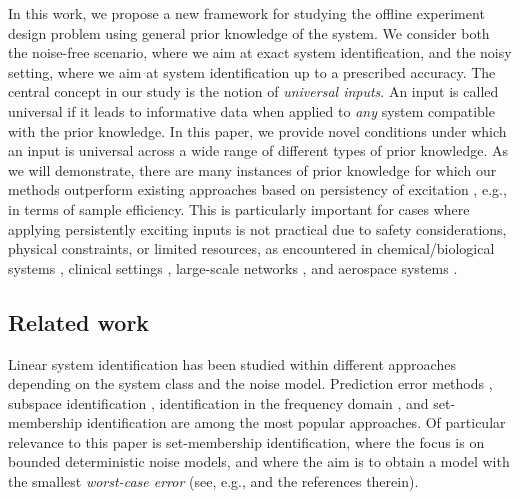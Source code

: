 \documentclass[journal,twoside,web]{ieeecolor}
\begin{document}
In this work, we propose a new framework for studying the offline experiment design problem using general prior knowledge of the system. We consider both the noise-free scenario, where we aim at exact system identification, and the noisy setting, where we aim at system identification up to a prescribed accuracy. The central concept in our study is the notion of \emph{universal inputs}. An input is called universal if it leads to informative data when applied to \emph{any} system compatible with the prior knowledge. In this paper, we provide novel conditions under which an input is universal across a wide range of different types of prior knowledge. As we will demonstrate, there are many instances of prior knowledge for which our methods outperform existing approaches based on persistency of excitation \cite{bai1985persistency,green1986persistence,willems2005note,coulson2022quantitative,berberich2023quantitative}, e.g., in terms of sample efficiency. This is particularly important for cases where applying persistently exciting inputs is not practical due to safety considerations, physical constraints, or limited resources, as encountered in chemical/biological systems \cite{sontag2003differential}, clinical settings \cite{engelhart2016comparison}, large-scale networks \cite{tsiamis2023statistical}, and aerospace systems \cite{prussing1970optimal}.

\subsection{Related work}

Linear system identification has been studied within different approaches depending on the system class and the noise model. Prediction error methods \cite{ljung1998system}, subspace identification \cite{van2012subspace}, identification in the frequency domain \cite{pintelon2012system}, and set-membership identification \cite{milanese2013bounding} are among the most popular approaches. Of particular relevance to this paper is set-membership identification, where the focus is on bounded deterministic noise models, and where the aim is to obtain a model with the smallest \emph{worst-case error} (see, e.g., \cite{milanese1991optimal,li2024learning,shakouri2025chebyshev,lauricella2020set} and the references therein). 
\end{document}
